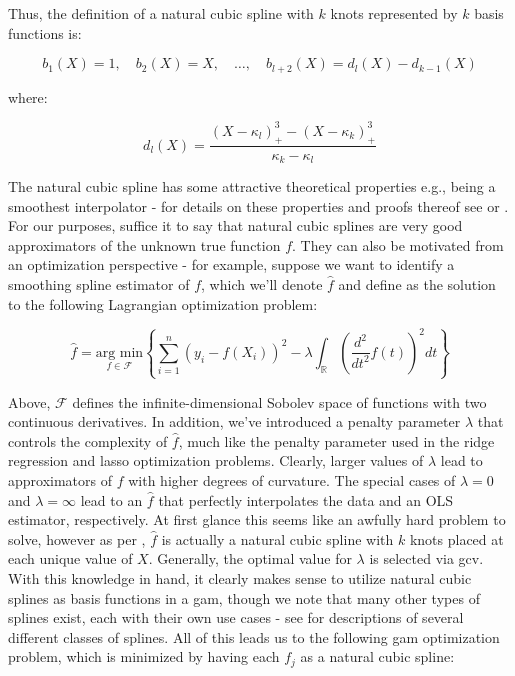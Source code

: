 \documentclass{report}
\begin{document}
Thus, the definition of a natural cubic spline with $k$ knots represented by $k$ basis functions is:

\begin{equation}\label{eq:glm-gam-natural-cubic-spline-1}
    b_1(X) = 1, \quad b_2(X) = X, \quad \dots, \quad b_{l+2}(X) = d_l(X) - d_{k-1}(X)
\end{equation}

where:

\begin{equation}\label{eq:glm-gam-natural-cubic-spline-2}
    d_l(X) = \frac{(X - \kappa_l)_+^3 - (X - \kappa_k)_+^3}{\kappa_k - \kappa_l}
\end{equation}

The natural cubic spline has some attractive theoretical properties e.g., being a smoothest interpolator - for details on these properties and proofs thereof see \cite[Chapter~5.1.1]{wood_generalized_2017} or \cite[Lecture~7]{molstad_sta_2022}. For our purposes, suffice it to say that natural cubic splines are very good approximators of the unknown true function $f$. They can also be motivated from an optimization perspective - for example, suppose we want to identify a smoothing spline estimator of $f$, which we'll denote $\hat{f}$ and define as the solution to the following Lagrangian optimization problem:

\begin{equation}\label{eq:glm-gam-smoothing-spline-optimizer}
    \hat{f} = \underset{f \in \mathcal{F}}{\text{arg min}} \left\{\sum_{i=1}^n \left(y_i - f(X_i)\right)^2 - \lambda \int_{\mathbb{R}} \left(\frac{d^2}{dt^2} f(t)\right)^2 dt \right\}
\end{equation}

Above, $\mathcal{F}$ defines the infinite-dimensional Sobolev space of functions with two continuous derivatives. In addition, we've introduced a penalty parameter $\lambda$ that controls the complexity of $\hat{f}$, much like the penalty parameter used in the ridge regression and \gls{lasso} optimization problems. Clearly, larger values of $\lambda$ lead to approximators of $f$ with higher degrees of curvature. The special cases of $\lambda = 0$ and $\lambda = \infty$ lead to an $\hat{f}$ that perfectly interpolates the data and an OLS estimator, respectively. At first glance this seems like an awfully hard problem to solve, however as per \cite[Lecture~7]{molstad_sta_2022}, $\hat{f}$ is actually a natural cubic spline with $k$ knots placed at each unique value of $X$. Generally, the optimal value for $\lambda$ is selected via \gls{gcv}. With this knowledge in hand, it clearly makes sense to utilize natural cubic splines as basis functions in a \gls{gam}, though we note that many other types of splines exist, each with their own use cases - see \cite[Chapter~5]{wood_generalized_2017} for descriptions of several different classes of splines. All of this leads us to the following \gls{gam} optimization problem, which is minimized by having each $f_j$ as a natural cubic spline:
\end{document}
